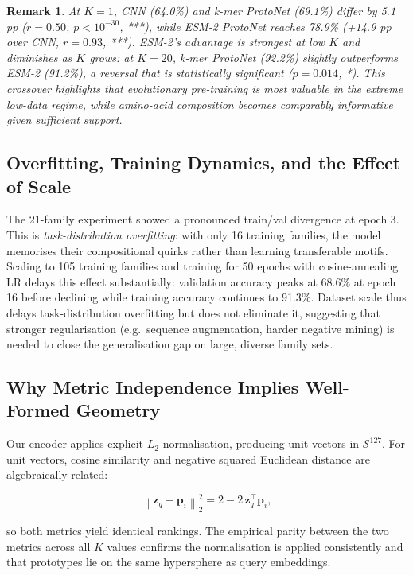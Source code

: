 \documentclass[11pt,a4paper]{article}
\newtheorem{remark}{Remark}
\newcommand{\norm}[1]{\left\| #1 \right\|}
\newcommand{\vect}[1]{\mathbf{#1}}
\begin{document}
\begin{remark}
At $K=1$, CNN (64.0\%) and k-mer ProtoNet (69.1\%) differ by 5.1 pp
($r=0.50$, $p < 10^{-30}$, ***), while ESM-2 ProtoNet reaches 78.9\% (+14.9 pp over CNN,
$r = 0.93$, ***).  ESM-2's advantage is strongest at low $K$ and diminishes
as $K$ grows: at $K=20$, k-mer ProtoNet (92.2\%) slightly outperforms ESM-2
(91.2\%), a reversal that is statistically significant ($p=0.014$, *).
This crossover highlights that evolutionary pre-training is most valuable in
the extreme low-data regime, while amino-acid composition becomes comparably
informative given sufficient support.
\end{remark}

\subsection{Overfitting, Training Dynamics, and the Effect of Scale}

The 21-family experiment showed a pronounced train/val divergence at epoch 3.
This is \emph{task-distribution overfitting}: with only 16 training families,
the model memorises their compositional quirks rather than learning transferable
motifs.  Scaling to 105 training families and training for 50 epochs with
cosine-annealing LR delays this effect substantially: validation accuracy peaks
at 68.6\% at epoch 16 before declining while training accuracy continues to 91.3\%.
Dataset scale thus delays task-distribution overfitting but does not eliminate it,
suggesting that stronger regularisation (e.g.\ sequence augmentation, harder
negative mining) is needed to close the generalisation gap on large, diverse
family sets.

\subsection{Why Metric Independence Implies Well-Formed Geometry}

Our encoder applies explicit $L_2$ normalisation, producing unit vectors in
$\mathcal{S}^{127}$.  For unit vectors, cosine similarity and negative squared
Euclidean distance are algebraically related:

\[
  \norm{\vect{z}_q - \vect{p}_i}_2^2 = 2 - 2\,\vect{z}_q^\top\vect{p}_i,
\]

so both metrics yield identical rankings.  The empirical parity between the two
metrics across all $K$ values confirms the normalisation is applied consistently
and that prototypes lie on the same hypersphere as query embeddings.
\end{document}
